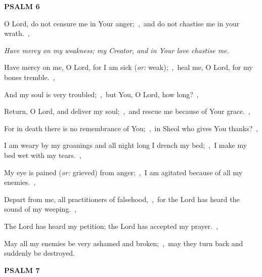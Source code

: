 \documentclass[12pt,twoside,a5paper]{article}
\newcommand{\psalm}[1]{\textbf{PSALM {#1}}}
\newcommand{\qanona}[1]{{\liturgicalhint{Qanona.} \emph{#1}}}
\newcommand{\translationoption}[1]{\emph{or:} #1}
\begin{document}
\psalm{6}

\begin{normalparskip}
  O Lord, do not censure me in Your anger;~\sep\ and do not chastise me in your wrath.~\sep

  \qanona{Have mercy on my weakness; my Creator, and in Your love chastise me.}

  Have mercy on me, O Lord, for I am sick (\translationoption{weak});~\sep\ heal me, O Lord, for my bones tremble.~\sep

  And my soul is very troubled;~\sep\ but You, O Lord, how long?~\sep

  Return, O Lord, and deliver my soul;~\sep\ and rescue me because of Your grace.~\sep

  For in death there is no remembrance of You;~\sep\ in Sheol who gives You thanks?~\sep

  I am weary by my groanings and all night long I drench my bed;~\sep\ I make my bed wet with my tears.~\sep

  My eye is pained (\translationoption{grieved}) from anger;~\sep\ I am agitated because of all my enemies.~\sep

  Depart from me, all practitioners of falsehood,~\sep\ for the Lord has heard the sound of my weeping.~\sep

  The Lord has heard my petition; the Lord has accepted my prayer.~\sep

  May all my enemies be very ashamed and broken;~\sep\ may they turn back and suddenly be destroyed.
\end{normalparskip}

\psalm{7}
\end{document}
